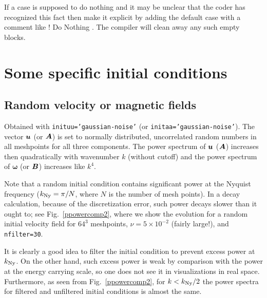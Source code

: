 \documentclass[\mydriver,12pt,twoside,notitlepage,a4paper]{article}
\newcommand{\code}[1]{\texttt{#1}}
\renewcommand{\vec}[1]{\mbox{\boldmath{$#1$}}}
\newcommand{\Av}            {\vec{A}}
\newcommand{\Bv}            {\vec{B}}
\newcommand{\uv}            {\vec{u}}
\newcommand{\omv}           {\boldsymbol{\omega}}
\begin{document}
If a case is supposed to do nothing and it may be unclear that the
coder has recognized this fact then make it explicit by adding the
default case with a comment like  ! Do Nothing  .
The compiler will clean away any such empty blocks.



\section{Some specific initial conditions}

\subsection{Random velocity or magnetic fields}

Obtained with \code{inituu='gaussian-noise'}
(or \code{initaa='gaussian-noise'}).
The vector $\uv$ (or $\Av$) is set to normally distributed, uncorrelated random
numbers in all meshpoints for all three components.
The power spectrum of
$\uv$ ($\Av$) increases then quadratically with wavenumber $k$ (without cutoff)
and the power spectrum of $\omv$ (or $\Bv$) increases like $k^4$.

Note that a random initial condition contains significant power at the
Nyquist frequency ($k_{\rm Ny}=\pi/N$, where $N$ is the number of mesh
points). In a decay calculation, because of the discretization error,
such power decays slower than it ought to; see Fig.~\ref{ppowercomp2},
where we show the evolution for a random initial velocity field for $64^3$
meshpoints, $\nu=5\times10^{-2}$ (fairly large!), and \code{nfilter=30}.

It is clearly a good idea to filter the initial condition to prevent
excess power at $k_{\rm Ny}$. On the other hand, such excess power is
weak by comparison with the power at the energy carrying scale, so one
does not see it in visualizations in real space. Furthermore, as seen
from Fig.~\ref{ppowercomp2}, for $k<k_{\rm Ny}/2$ the power spectra for
filtered and unfiltered initial conditions is almost the same.
\end{document}

